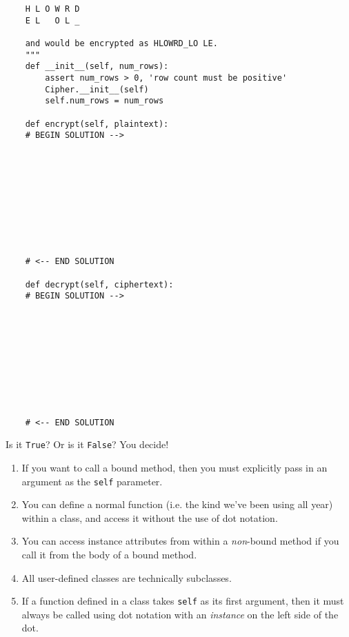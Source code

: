\documentclass[twoside]{article}
\begin{document}
\begin{enumerate}
\begin{lstlisting}
    H L O W R D
    E L   O L _
    
    and would be encrypted as HLOWRD_LO LE.
    """
    def __init__(self, num_rows):
        assert num_rows > 0, 'row count must be positive'
        Cipher.__init__(self)
        self.num_rows = num_rows
    
    def encrypt(self, plaintext):
    # BEGIN SOLUTION -->










    # <-- END SOLUTION   
    
    def decrypt(self, ciphertext):
    # BEGIN SOLUTION -->
    
    
    
    
    
    
    



    # <-- END SOLUTION
\end{lstlisting}


Is it \texttt{True}? Or is it \texttt{False}? You decide!
\vspace{0.1in}

\begin{enumerate}
\item If you want to call a bound method, then you must explicitly pass in an argument as the \texttt{self} parameter.\\

\item You can define a normal function (i.e. the kind we've been using all year) within a class, and access it without the use of dot notation.\\

\item You can access instance attributes from within a \textit{non}-bound method if you call it from the body of a bound method.\\

\item All user-defined classes are technically subclasses.\\

\item If a function defined in a class takes \texttt{self} as its first argument, then it must always be called using dot notation with an \textit{instance} on the left side of the dot.\\


\end{enumerate}
\end{enumerate}
\end{document}
